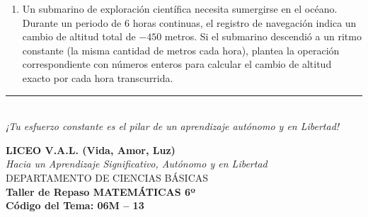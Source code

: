 \documentclass[12pt, letterpaper]{article}
\begin{document}
\begin{enumerate}[itemsep=0.8cm]
		Durante su partida, Camilo cayó en la trampa de agua $4$ veces, tocó un obstáculo móvil $3$ veces y se quedó sin tiempo $2$ veces. Utiliza la multiplicación y suma de números enteros para plantear la operación y determinar cuántos puntos en total se le deben descontar a Camilo.
		
		\item Un submarino de exploración científica necesita sumergirse en el océano. Durante un periodo de $6$ horas continuas, el registro de navegación indica un cambio de altitud total de $-450$ metros. Si el submarino descendió a un ritmo constante (la misma cantidad de metros cada hora), plantea la operación correspondiente con números enteros para calcular el cambio de altitud exacto por cada hora transcurrida.
		
	\end{enumerate}
	
	\vfill
	\begin{center}
		\rule{0.5\textwidth}{0.4pt} \\
		\vspace{0.2cm}
		\textit{¡Tu esfuerzo constante es el pilar de un aprendizaje autónomo y en Libertad!}
	\end{center}
	
	\newpage
	
	\begin{center}
		{\Large \textbf{LICEO V.A.L. (Vida, Amor, Luz)}}\\[0.1cm]
		{\normalsize \textit{Hacia un Aprendizaje Significativo, Autónomo y en Libertad}}\\[0.2cm]
		{\large DEPARTAMENTO DE CIENCIAS BÁSICAS}\\[0.1cm]
		\textbf{Taller de Repaso MATEMÁTICAS 6º}\\[0.1cm]
		\textbf{Código del Tema: 06M – 13}\\[0.1cm]
	\end{center}
	
\end{document}
